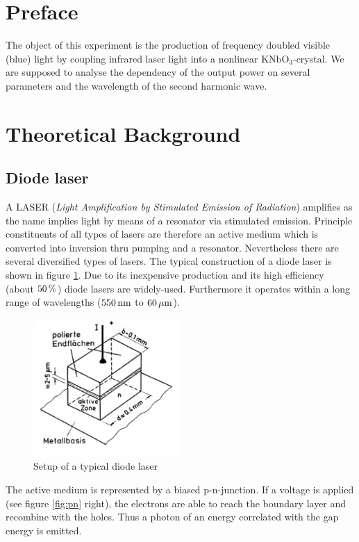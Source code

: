 \documentclass{protokoll_en}
\begin{document}
\section{Preface}
The object of this experiment is the production of frequency doubled visible (blue) light by coupling infrared laser light into a nonlinear $\mathrm{KNbO}_3$-crystal. We are supposed to analyse the dependency of the output power on several parameters and the wavelength of the second harmonic wave.

\section{Theoretical Background}
\subsection{Diode laser}
A LASER (\emph{Light Amplification by Stimulated Emission of Radiation}) amplifies as the name implies light by means of a resonator via stimulated emission. Principle constituents of all types of lasers are therefore an active medium which is converted into inversion thru pumping and a resonator. Nevertheless there are several diversified types of lasers. The typical construction of a diode laser is shown in figure \ref{fig:laser}. Due to its inexpensive production and its high efficiency (about $\unit[50]{\%}$) diode lasers are widely-used. Furthermore it operates within a long range of wavelengths ($\unit[550]{nm}$ to $\unit[60]{\mu m}$).
\begin{figure}[H]
	\centering
		\includegraphics[width=0.5\textwidth]{graphics/laser}
	\caption{Setup of a typical diode laser~\cite{demtroed}}
	\label{fig:laser}
\end{figure}
The active medium is represented by a biased p-n-junction. If a voltage is applied (see figure \ref{fig:pn} right), the electrons are able to reach the boundary layer and recombine with the holes. Thus a photon of an energy correlated with the gap energy is emitted.
\end{document}
